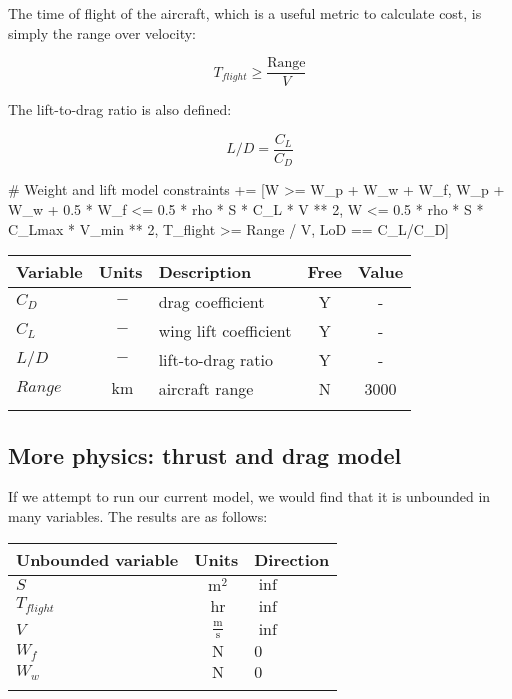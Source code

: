 The time of flight of the aircraft, which is a useful metric to calculate cost, is simply the range over velocity:

\begin{equation}
    T_{flight} \geq \frac{\mathrm{Range}}{V}
\end{equation}

The lift-to-drag ratio is also defined: 

\begin{equation}
    L/D = \frac{C_L}{C_D}    
\end{equation}

\begin{python}
        # Weight and lift model
        constraints += [W >= W_p + W_w + W_f,
                W_p + W_w + 0.5 * W_f <=
                        0.5 * rho * S * C_L * V ** 2,
                W <= 0.5 * rho * S * C_Lmax * V_min ** 2,
                T_flight >= Range / V,
                LoD == C_L/C_D]
\end{python}

\footnotesize
\centering
\begin{tabular}{ l c l c c }
    \toprule
	Variable & Units & Description & Free & Value \\
    \midrule
    $C_D$ & $~\mathrm{-}$ & drag coefficient & Y & - \\
    $C_L$ & $~\mathrm{-}$ & wing lift coefficient & Y & - \\
    $L/D$ & $~\mathrm{-}$ & lift-to-drag ratio & Y & - \\
    $Range$ & $~\mathrm{km}$ & aircraft range & N & 3000 \\
    \bottomrule
\label{tab:vars_perfMetrics}
\end{tabular}

\subsection{More physics: thrust and drag model}

If we attempt to run our current model, we would find that it is unbounded in many variables.
The results are as follows:

\footnotesize
\begin{tabular}{ l c l }
    \toprule
	Unbounded variable & Units & Direction \\
    \midrule
    $S$ & $~\mathrm{m^{2}}$ & $\inf$ \\
    $T_{flight}$ & $~\mathrm{hr}$ & $\inf$ \\
    $V$ &  $~\mathrm{\tfrac{m}{s}}$  & $\inf$ \\
    $W_f$ & $~\mathrm{N}$ & $0$ \\
    $W_w$ & $~\mathrm{N}$  & $0$ \\
    \bottomrule
\label{tab:WandL_unbounded}
\end{tabular}


